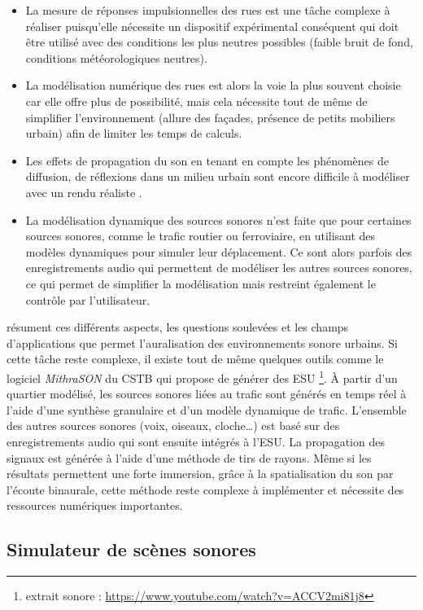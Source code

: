 \begin{itemize}
\item La mesure de réponses impulsionnelles des rues \cite{picaut2005experimental} est une tâche complexe à réaliser puisqu'elle nécessite un dispositif expérimental conséquent qui doit être utilisé avec des conditions les plus neutres possibles (faible bruit de fond, conditions météorologiques neutres).
\item La modélisation numérique des rues est alors la voie la plus souvent choisie car elle offre plus de possibilité, mais cela nécessite tout de même de simplifier l'environnement (allure des façades, présence de petits mobiliers urbain) afin de limiter les temps de calculs.
\item Les effets de propagation du son en tenant en compte les phénomènes de diffusion, de réflexions dans un milieu urbain sont encore difficile à modéliser avec un rendu réaliste \cite{schissler2014high}.
\item La modélisation dynamique des sources sonores n'est faite que pour certaines sources sonores, comme le trafic routier ou ferroviaire, en utilisant des modèles dynamiques pour simuler leur déplacement. Ce sont alors parfois des enregistrements audio qui permettent de modéliser les autres sources sonores, ce qui permet de simplifier la modélisation mais restreint également le contrôle par l'utilisateur. 
\end{itemize}

\cite{stienen2015auralization} résument ces différents aspects, les questions soulevées et les champs d'applications que permet l'auralisation des environnements sonore urbains.
Si cette tâche reste complexe, il existe tout de même quelques outils comme le logiciel \textit{MithraSON} du CSTB qui propose de générer des ESU \footnote{extrait sonore : \url{https://www.youtube.com/watch?v=ACCV2mi81j8}}. À partir d'un quartier modélisé, les sources sonores liées au trafic sont générés en temps réel  à l'aide d'une synthèse granulaire et d'un modèle dynamique de trafic. L'ensemble des autres sources sonores (voix, oiseaux, cloche\dots) est basé sur des enregistrements audio qui sont ensuite intégrés à l'ESU. La propagation des signaux est générée à l'aide d'une méthode de tirs de rayons.
Même si les résultats permettent une forte immersion, grâce à la spatialisation du son par l'écoute binaurale, cette méthode reste complexe à implémenter et nécessite des ressources numériques importantes.

\subsection{Simulateur de scènes sonores}

